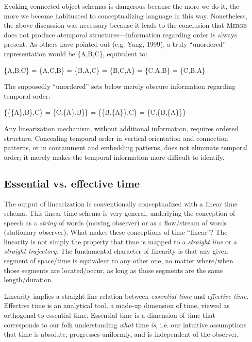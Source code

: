   Evoking connected object schemas is dangerous because the more we do it, the more we become habituated to conceptualizing language in this way. Nonetheless, the above discussion was necessary because it leads to the conclusion that \textsc{Merge} does not produce atemporal structures—information regarding order is always present. As others have pointed out (e.g. Yang, 1999), a truly “unordered” representation would be \{A,B,C\}, equivalent to:

  \{A,B,C\} = \{A,C,B\} = \{B,A,C\} = \{B,C,A\} = \{C,A,B\} = \{C,B,A\}

The supposedly “unordered” sets below merely obscure information regarding temporal order:

  \{\{\{A\},B\},C\} = \{C,\{A\},B\}\} = \{\{B,\{A\}\},C\} = \{C,\{B,\{A\}\}\}

Any linearization mechanism, without additional information, requires ordered structure. Concealing temporal order in vertical orientation and connection patterns, or in containment and embedding patterns, does not eliminate temporal order; it merely makes the temporal information more difficult to identify. 

\subsection{Essential vs. effective time}

The output of linearization is conventionally conceptualized with a linear time schema. This linear time schema is very general, underlying the conception of speech as a \textit{string} of words (moving observer) or as a flow/stream of words (stationary observer). What makes these conceptions of time “linear”?  The linearity is not simply the property that time is mapped to a \textit{straight line} or a \textit{straight trajectory}. The fundamental character of linearity is that any given segment of space/time is equivalent to any other one, no matter where/when those segments are located/occur, as long as those segments are the same length/duration. 

  Linearity implies a straight line relation between \textit{essential time} and \textit{effective time}. Effective time is an analytical tool, a made-up dimension of time, viewed as orthogonal to essential time. Essential time is a dimension of time that corresponds to our folk understanding \textit{what} time \textit{is}, i.e. our intuitive assumptions that time is absolute, progresses uniformly, and is independent of the observer.

